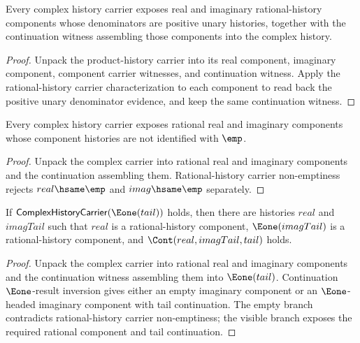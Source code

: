 \begin{theorem}
\label{thm:complex-history-carrier-positive-components}
Every complex history carrier exposes real and imaginary rational-history
components whose denominators are positive unary histories, together with the
continuation witness assembling those components into the complex history.
\end{theorem}
\begin{proof}
Unpack the product-history carrier into its real component, imaginary
component, component carrier witnesses, and continuation witness. Apply the
rational-history carrier characterization to each component to read back the
positive unary denominator evidence, and keep the same continuation witness.
\end{proof}

\begin{theorem}
\label{thm:complex-history-carrier-components-nonempty}
Every complex history carrier exposes rational real and imaginary components
whose component histories are not identified with $\emp$.
\end{theorem}
\begin{proof}
Unpack the complex carrier into rational real and imaginary components and the
continuation assembling them. Rational-history carrier non-emptiness rejects
$real\hsame\emp$ and $imag\hsame\emp$ separately.
\end{proof}

\begin{theorem}
\label{thm:complex-history-carrier-e1-tail-components}
If $\mathsf{ComplexHistoryCarrier}(\Eone(tail))$ holds, then there are
histories $real$ and $imagTail$ such that $real$ is a rational-history
component, $\Eone(imagTail)$ is a rational-history component, and
$\Cont(real,imagTail,tail)$ holds.
\end{theorem}
\begin{proof}
Unpack the complex carrier into rational real and imaginary components and the
continuation witness assembling them into $\Eone(tail)$. Continuation
$\Eone$-result inversion gives either an empty imaginary component or an
$\Eone$-headed imaginary component with tail continuation. The empty branch
contradicts rational-history carrier non-emptiness; the visible branch exposes
the required rational component and tail continuation.
\end{proof}

